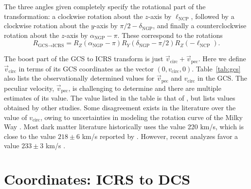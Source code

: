 The three angles given completely specify the rotational part of the transformation: a clockwise rotation about the $z$-axis by $\ell_\text{NCP}$, followed by a clockwise rotation about the $y$-axis by $\pi/2-\delta_\text{NGP}$, and finally a counterclockwise rotation about the $z$-axis by $\alpha_\text{NGP}-\pi$. These correspond to the rotations
\begin{equation}
    R_{\text{GCS}\rightarrow\text{ICRS}}=R_Z(\alpha_\text{NGP}-\pi)R_Y(\delta_\text{NGP}-\pi/2)R_Z(-\ell_\text{NCP}).
\end{equation}

The boost part of the GCS to ICRS transform is just $\vec{v}_\text{circ}+\vec{v}_\text{pec}$. Here we define $\vec{v}_\text{circ}$ in terms of its GCS coordinates as the vector $(0,v_\text{circ},0)$. Table~\ref{tab:gcs} also lists the observationally determined values for $\vec{v}_\text{pec}$ and $v_\text{circ}$ in the GCS. The peculiar velocity, $\vec{v}_\text{pec}$, is challenging to determine and there are multiple estimates of its value. The value listed in the table is that of \textcite{SchonrichBinneyDehnen2010}, but \textcite{Coskunoglu2011} lists values obtained by other studies. Some disagreement exists in the literature over the value of $v_\text{circ}$, owing to uncertainties in modeling the rotation curve of the Milky Way \parencite{McMillanBinney2009}. Most dark matter literature historically uses the value 220 km/s, which is close to the value $218\pm6$ km/s reported by \textcite{Bovy2012}. However, recent analyzes favor a value $233\pm3$ km/s \parencites{McMillan2017, EvansOHareMcCabe2019}.

\section{Coordinates: ICRS to DCS}


